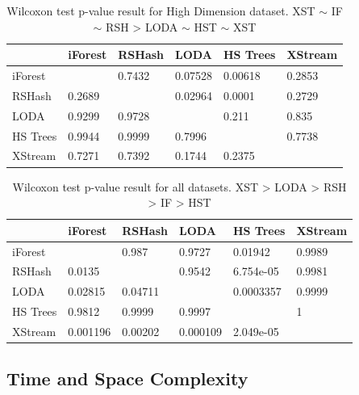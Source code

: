 \begin{table}
\centering
    \begin{tabular}{|l|lllll|}
    \hline
    ~        & iForest   & RSHash    & LODA      & HS Trees  & XStream \\	\hline
    iForest  & ~         & 0.7432    & 0.07528    & 0.00618    & 0.2853       \\ 
    RSHash   & 0.2689    & ~         &  0.02964   & 0.0001    & 0.2729       \\
    LODA     & 0.9299   & 0.9728   & ~         & 0.211   & 0.835      \\
    HS Trees & 0.9944    & 0.9999    & 0.7996     & ~         & 0.7738       \\
    XStream  & 0.7271 & 0.7392 & 0.1744 & 0.2375 & ~       \\	\hline
    \end{tabular}
    \caption{Wilcoxon test p-value result for High Dimension dataset. XST $\sim$ IF $\sim$ RSH >  LODA $\sim$ HST $\sim$ XST}
\end{table}

\begin{table}
\centering
    \begin{tabular}{|l|lllll|}
    \hline
    ~        & iForest   & RSHash    & LODA      & HS Trees  & XStream \\	\hline
    iForest  & ~         & 0.987    & 0.9727    & 0.01942    & 0.9989       \\ 
    RSHash   & 0.0135    & ~         &  0.9542   & 6.754e-05    & 0.9981       \\
    LODA     & 0.02815   & 0.04711   & ~         & 0.0003357   & 0.9999      \\
    HS Trees & 0.9812    & 0.9999    & 0.9997     & ~         & 1       \\
    XStream  & 0.001196 & 0.00202 & 0.000109 & 2.049e-05 & ~       \\	\hline
    \end{tabular}
    \caption{Wilcoxon test p-value result for all datasets. XST > LODA > RSH > IF > HST}
\end{table}


\subsection{Time and Space Complexity}
%
%

